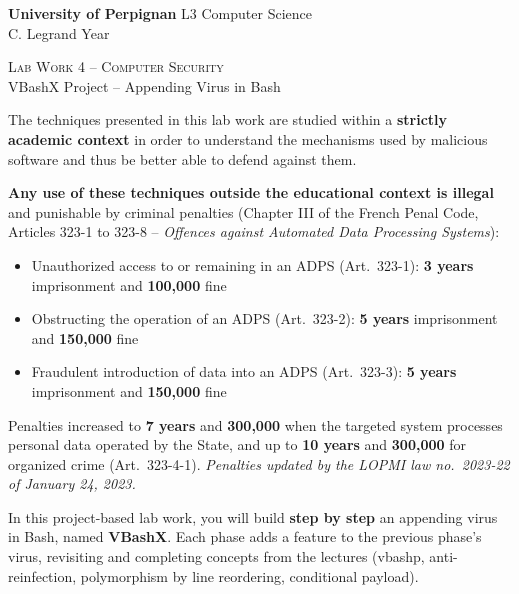 \documentclass[a4paper,11pt]{article}
\theoremstyle{plain}
\theoremstyle{definition}
\begin{document}
\hbox{}
\noindent \textbf{University of Perpignan} \hfill  L3 Computer Science \\
 \hfill C. Legrand \hfill  Year \the\year  \\
\smallskip
\begin{center}
{
 {\scshape \large Lab Work 4 -- Computer Security}  \\
 VBashX Project -- Appending Virus in Bash
}
\end{center}
\hbox{}

\bigskip

\begin{ethique}
The techniques presented in this lab work are studied within a \textbf{strictly academic context} in order to understand the mechanisms used by malicious software and thus be better able to defend against them.

\textbf{Any use of these techniques outside the educational context is illegal} and punishable by criminal penalties (Chapter III of the French Penal Code, Articles 323-1 to 323-8 -- \textit{Offences against Automated Data Processing Systems}):
\begin{itemize}
    \item Unauthorized access to or remaining in an ADPS (Art.~323-1): \textbf{3 years} imprisonment and \textbf{\texteuro{}100,000} fine
    \item Obstructing the operation of an ADPS (Art.~323-2): \textbf{5 years} imprisonment and \textbf{\texteuro{}150,000} fine
    \item Fraudulent introduction of data into an ADPS (Art.~323-3): \textbf{5 years} imprisonment and \textbf{\texteuro{}150,000} fine
\end{itemize}
Penalties increased to \textbf{7 years} and \textbf{\texteuro{}300,000} when the targeted system processes personal data operated by the State, and up to \textbf{10 years} and \textbf{\texteuro{}300,000} for organized crime (Art.~323-4-1). \textit{Penalties updated by the LOPMI law no.~2023-22 of January 24, 2023.}
\end{ethique}

\bigskip


\noindent
In this project-based lab work, you will build \textbf{step by step} an appending virus in Bash, named \textbf{VBashX}. Each phase adds a feature to the previous phase's virus, revisiting and completing concepts from the lectures (vbashp, anti-reinfection, polymorphism by line reordering, conditional payload).
\end{document}
